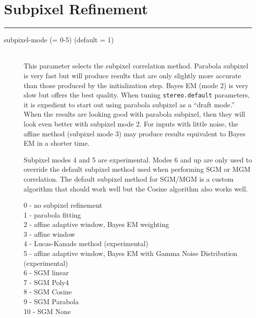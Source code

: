 

\section{Subpixel Refinement}
\hrule
\bigskip

\begin{description}

\item[subpixel-mode \textnormal{\small{(= 0-5)}} (default = 1)] \hfill \\
  This parameter selects the subpixel correlation method. Parabola subpixel
  is very fast but will produce results that are only slightly more accurate
   than those produced by the initialization step. Bayes EM (mode 2)
  is very slow but offers the best quality. When tuning {\tt stereo.default}
  parameters, it is expedient to start out using parabola subpixel as a
  ``draft mode.'' When the results are looking good with parabola subpixel,
  then they  will look even better with subpixel mode 2.  For inputs with
  little noise, the affine method (subpixel mode 3) may produce results
  equivalent to Bayes EM in a shorter time.
  
  Subpixel modes 4 and 5 are experimental.  Modes 6 and up are only used to
  override the default subpixel method used when performing SGM or MGM 
  correlation.  The default subpixel method for SGM/MGM is a custom 
  algorithm that should work well but the Cosine algorithm also works well.

  \begin{description}
    \item[0 - no subpixel refinement]
    \item[1 - parabola fitting ]
    \item[2 - affine adaptive window, Bayes EM weighting ]
    \item[3 - affine window ]
    \item[4 - Lucas-Kanade method (experimental)]
    \item[5 - affine adaptive window, Bayes EM with Gamma Noise Distribution (experimental) ]
    \item[6 - SGM linear ]
    \item[7 - SGM Poly4 ]
    \item[8 - SGM Cosine ]
    \item[9 - SGM Parabola ]
    \item[10 - SGM None ]
  \end{description}


\end{description}
